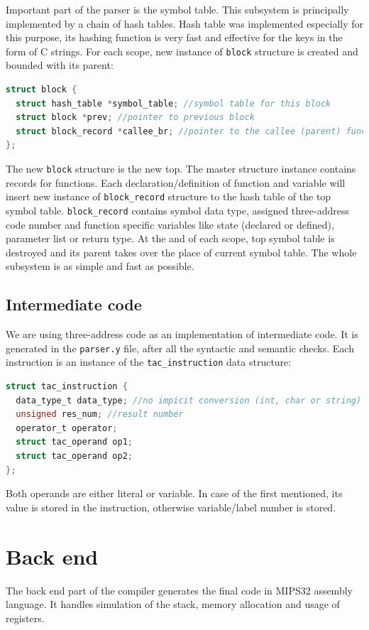 \documentclass[a4paper]{article}[25.12.2015]
\begin{document}
Important part of the parser is the symbol table.
This subsystem is principally implemented by a chain of hash tables.
Hash table was implemented especially for this purpose, its hashing function is very fast and effective for the keys in the form of C strings.
For each scope, new instance of \texttt{block} structure is created and bounded with its parent:
\begin{lstlisting}[language=C]
struct block {
  struct hash_table *symbol_table; //symbol table for this block
  struct block *prev; //pointer to previous block
  struct block_record *callee_br; //pointer to the callee (parent) function block record
};
\end{lstlisting}
The new \texttt{block} structure is the new top.
The master structure instance contains records for functions.
Each declaration/definition of function and variable will insert new instance of \texttt{block_record} structure to the hash table of the top symbol table.
\texttt{block_record} contains symbol data type, assigned three-address code number and function specific variables like state (declared or defined), parameter list or return type.
At the and of each scope, top symbol table is destroyed and its parent takes over the place of current symbol table.
The whole subsystem is as simple and fast as possible.

\subsection*{Intermediate code}
We are using three-address code as an implementation of intermediate code.
It is generated in the \texttt{parser.y} file, after all the syntactic and semantic checks.
Each instruction is an instance of the \texttt{tac_instruction} data structure:
\begin{lstlisting}[language=C]
struct tac_instruction {
  data_type_t data_type; //no impicit conversion (int, char or string)
  unsigned res_num; //result number
  operator_t operator;
  struct tac_operand op1;
  struct tac_operand op2;
};
\end{lstlisting}
Both operands are either literal or variable.
In case of the first mentioned, its value is stored in the instruction, otherwise variable/label number is stored.

\section{Back end}
The back end part of the compiler generates the final code in MIPS32 assembly language. It handles simulation of the stack, memory allocation and usage of registers.
\end{document}
